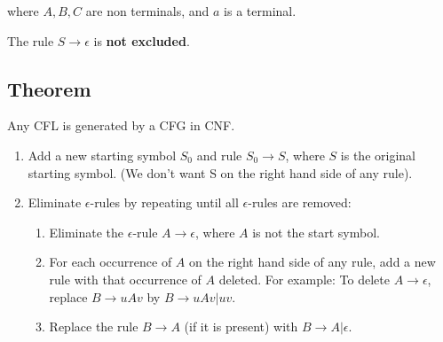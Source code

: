 \documentclass{article}
\begin{document}
where $A,B,C$ are non terminals, and $a$ is a terminal.

The rule $S\rightarrow\epsilon$ is \textbf{not excluded}.

\subsection*{Theorem}

Any CFL is generated by a CFG in CNF.

\begin{enumerate}
\item Add a new starting symbol $S_0$ and rule $S_0\rightarrow{}S$,
  where $S$ is the original starting symbol. (We don't want S on the
  right hand side of any rule).

\item Eliminate $\epsilon$-rules by repeating until all $\epsilon$-rules are removed:
  \begin{enumerate}[label=(\alph*)]
    \item Eliminate the $\epsilon$-rule $A\rightarrow\epsilon$, where
      $A$ is not the start symbol.

    \item For each occurrence of $A$ on the right hand side of any
      rule, add a new rule with that occurrence of $A$ deleted. For
      example: To delete $A\rightarrow\epsilon$, replace
      $B\rightarrow{}uAv$ by $B\rightarrow{}uAv|uv$.

    \item Replace the rule $B\rightarrow{}A$ (if it is present) with
      $B\rightarrow{}A|\epsilon$.
  \end{enumerate}
\end{enumerate}
\end{document}
